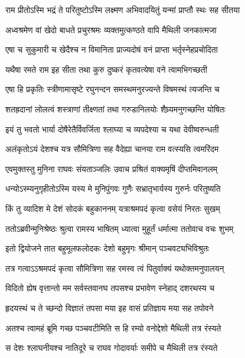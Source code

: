 
\twolineshloka
{राम प्रीतोऽस्मि भद्रं ते परितुष्टोऽस्मि लक्ष्मण}
{अभिवादयितुं यन्मां प्राप्तौ स्थः सह सीतया} %

\twolineshloka
{अध्वश्रमेण वां खेदो बाधते प्रचुरश्रमः}
{व्यक्तमुत्कण्ठते वापि मैथिली जनकात्मजा} %

\twolineshloka
{एषा च सुकुमारी च खेदैश्च न विमानिता}
{प्राज्यदोषं वनं प्राप्ता भर्तृस्नेहप्रचोदिता} %

\twolineshloka
{यथैषा रमते राम इह सीता तथा कुरु}
{दुष्करं कृतवत्येषा वने त्वामभिगच्छती} %

\twolineshloka
{एषा हि प्रकृतिः स्त्रीणामासृष्टे रघुनन्दन}
{समस्थमनुरज्यन्ते विषमस्थं त्यजन्ति च} %

\twolineshloka
{शतह्रदानां लोलत्वं शस्त्राणां तीक्ष्णतां तथा}
{गरुडानिलयोः शैघ्र्यमनुगच्छन्ति योषितः} %

\twolineshloka
{इयं तु भवतो भार्या दोषैरेतैर्विवर्जिता}
{श्लाघ्या च व्यपदेश्या च यथा देवीष्वरुन्धती} %

\twolineshloka
{अलंकृतोऽयं देशश्च यत्र सौमित्रिणा सह}
{वैदेह्या चानया राम वत्स्यसि त्वमरिंदम} %

\twolineshloka
{एवमुक्तस्तु मुनिना राघवः संयताञ्जलिः}
{उवाच प्रश्रितं वाक्यमृषिं दीप्तमिवानलम्} %

\twolineshloka
{धन्योऽस्म्यनुगृहीतोऽस्मि यस्य मे मुनिपुंगवः}
{गुणैः सभ्रातृभार्यस्य गुरुर्नः परितुष्यति} %

\twolineshloka
{किं तु व्यादिश मे देशं सोदकं बहुकाननम्}
{यत्राश्रमपदं कृत्वा वसेयं निरतः सुखम्} %

\twolineshloka
{ततोऽब्रवीन्मुनिश्रेष्ठः श्रुत्वा रामस्य भाषितम्}
{ध्यात्वा मुहूर्तं धर्मात्मा ततोवाच वचः शुभम्} %

\twolineshloka
{इतो द्वियोजने तात बहुमूलफलोदकः}
{देशो बहुमृगः श्रीमान् पञ्चवट्यभिविश्रुतः} %

\twolineshloka
{तत्र गत्वाऽऽश्रमपदं कृत्वा सौमित्रिणा सह}
{रमस्व त्वं पितुर्वाक्यं यथोक्तमनुपालयन्} %

\twolineshloka
{विदितो ह्येष वृत्तान्तो मम सर्वस्तवानघ}
{तपसश्च प्रभावेण स्नेहाद् दशरथस्य च} %

\twolineshloka
{हृदयस्थं च ते च्छन्दो विज्ञातं तपसा मया}
{इह वासं प्रतिज्ञाय मया सह तपोवने} %

\twolineshloka
{अतश्च त्वामहं ब्रूमि गच्छ पञ्चवटीमिति}
{स हि रम्यो वनोद्देशो मैथिली तत्र रंस्यते} %

\twolineshloka
{स देशः श्लाघनीयश्च नातिदूरे च राघव}
{गोदावर्याः समीपे च मैथिली तत्र रंस्यते} %

